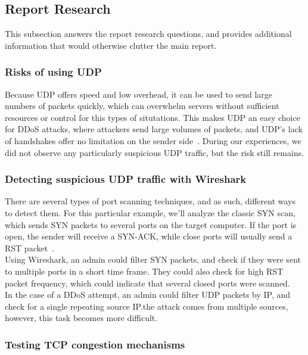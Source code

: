 \subsection{Report Research}

This subsection answers the report research questions, and provides additional
information that would otherwise clutter the main report.

\subsubsection{Risks of using UDP}
Because UDP offers speed and low overhead, it can be used to send large numbers
of packets quickly, which can overwhelm servers without sufficient resources or
control for this types of situtations. This makes UDP an easy choice for DDoS
attacks, where attackers send large volumes of packets, and UDP's lack of
handshakes offer no limitation on the sender side~\cite{mirkovic2004taxonomy}.
During our experiences, we did not observe any particularly suspicious UDP
traffic, but the risk still remains.

\subsubsection{Detecting suspicious UDP traffic with Wireshark}
There are several types of port scanning techniques, and as such, different
ways to detect them. For this particular example, we'll analyze the classic SYN
scan, which sends SYN packets to several ports on the target computer. If the
port is open, the sender will receive a SYN-ACK, while close ports will usually
send a RST packet~\cite{rfc3360}. \\

Using Wireshark, an admin could filter SYN packets, and check if they were sent
to multiple ports in a short time frame. They could also check for high RST
packet frequency, which could indicate that several closed ports were
scanned.\\

In the case of a DDoS attempt, an admin could filter UDP packets by IP, and
check for a single repeating source IP.\@If the attack comes from multiple
sources, however, this task becomes more difficult.

\subsubsection{Testing TCP congestion mechanisms}
